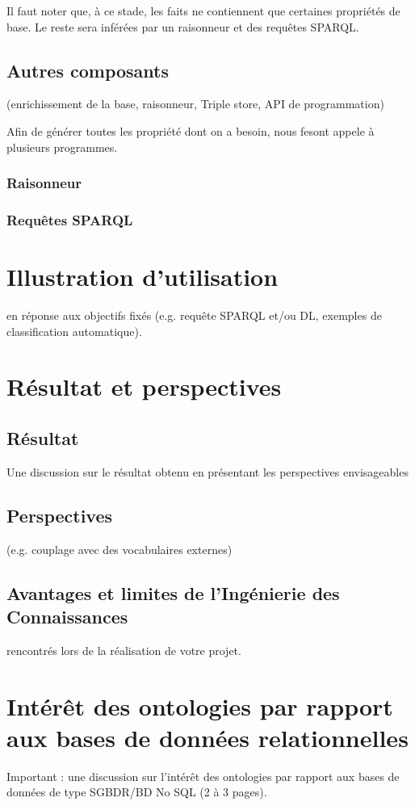 \documentclass[oneside,13pt,a4paper]{article}
\begin{document}
Il faut noter que, à ce stade, les faits ne contiennent que certaines propriétés de base. Le reste sera inférées par un raisonneur et des requêtes SPARQL.

\subsection{Autres composants}

(enrichissement de la base, raisonneur, Triple store, API de programmation)

Afin de générer toutes les propriété dont on a besoin, nous fesont appele à plusieurs programmes.

\subsubsection{Raisonneur}



\subsubsection{Requêtes SPARQL}


\section{Illustration d'utilisation}

en réponse aux objectifs fixés (e.g. requête SPARQL
et/ou DL, exemples de classification automatique).

\section{Résultat et perspectives}

\subsection{Résultat}

Une discussion sur le résultat obtenu en présentant les perspectives envisageables

\subsection{Perspectives}

(e.g. couplage avec des vocabulaires externes)

\subsection{Avantages et limites de l’Ingénierie des Connaissances}

rencontrés lors de la réalisation de votre projet.

\section{Intérêt des ontologies par rapport aux bases de données relationnelles}

Important : une discussion sur l’intérêt des ontologies par rapport aux bases de données de
type SGBDR/BD No SQL (2 à 3 pages).
\end{document}

